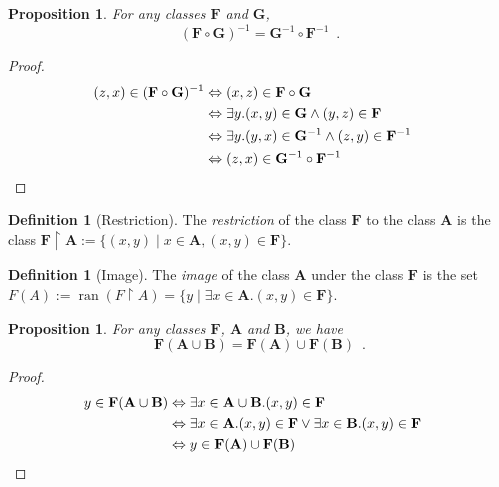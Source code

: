 \documentclass{book}
\let\qed\relax
\newtheorem{prop}[ax]{Proposition}
\theoremstyle{definition}
\newtheorem{df}[ax]{Definition}
\newcommand{\ran}{\ensuremath{\operatorname{ran}}}
\begin{document}
\begin{prop}
For any classes $\mathbf{F}$ and $\mathbf{G}$,
\[ (\mathbf{F} \circ \mathbf{G})^{-1} = \mathbf{G}^{-1} \circ \mathbf{F}^{-1} \enspace . \]
\end{prop}

\begin{proof}
\pf
\begin{align*}
(z,x) \in (\mathbf{F} \circ \mathbf{G})^{-1} & \Leftrightarrow (x,z) \in \mathbf{F} \circ \mathbf{G} \\
& \Leftrightarrow \exists y. (x,y) \in \mathbf{G} \wedge (y,z) \in \mathbf{F} \\
& \Leftrightarrow \exists y. (y,x) \in \mathbf{G}^{-1} \wedge (z,y) \in \mathbf{F}^{-1} \\
& \Leftrightarrow (z,x) \in \mathbf{G}^{-1} \circ \mathbf{F}^{-1} & \qed
\end{align*}
\end{proof}

\begin{df}[Restriction]
The \emph{restriction} of the class $\mathbf{F}$ to the class $\mathbf{A}$ is the class $\mathbf{F} \restriction \mathbf{A} := \{ (x,y) \mid x \in \mathbf{A}, (x,y) \in \mathbf{F} \}$.
\end{df}

\begin{df}[Image]
The \emph{image} of the class $\mathbf{A}$ under the class $\mathbf{F}$ is the set $F(A) := \ran (F \restriction A) = \{ y \mid \exists x \in \mathbf{A}. (x,y) \in \mathbf{F} \}$.
\end{df}

\begin{prop}
For any classes $\mathbf{F}$, $\mathbf{A}$ and $\mathbf{B}$, we have
\[ \mathbf{F}(\mathbf{A} \cup \mathbf{B}) = \mathbf{F}(\mathbf{A}) \cup \mathbf{F}(\mathbf{B}) \enspace . \]
\end{prop}

\begin{proof}
\pf
\begin{align*}
	y \in \mathbf{F}(\mathbf{A} \cup \mathbf{B})
	& \Leftrightarrow \exists x \in \mathbf{A} \cup \mathbf{B}. (x,y) \in \mathbf{F} \\
	& \Leftrightarrow \exists x \in \mathbf{A}. (x,y) \in \mathbf{F} \vee \exists x \in \mathbf{B}. (x,y) \in \mathbf{F} \\
	& \Leftrightarrow y \in \mathbf{F}(\mathbf{A}) \cup \mathbf{F}(\mathbf{B}) & \qed
\end{align*}
\end{proof}
\end{document}
